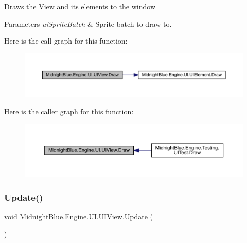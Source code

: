 Draws the View and its elements to the window 


\begin{DoxyParams}{Parameters}
{\em ui\+Sprite\+Batch} & Sprite batch to draw to.\\
\hline
\end{DoxyParams}
Here is the call graph for this function\+:
\nopagebreak
\begin{figure}[H]
\begin{center}
\leavevmode
\includegraphics[width=350pt]{class_midnight_blue_1_1_engine_1_1_u_i_1_1_u_i_view_a167c98165d6ed4031b371c6a92b95a1e_cgraph}
\end{center}
\end{figure}
Here is the caller graph for this function\+:
\nopagebreak
\begin{figure}[H]
\begin{center}
\leavevmode
\includegraphics[width=350pt]{class_midnight_blue_1_1_engine_1_1_u_i_1_1_u_i_view_a167c98165d6ed4031b371c6a92b95a1e_icgraph}
\end{center}
\end{figure}
\hypertarget{class_midnight_blue_1_1_engine_1_1_u_i_1_1_u_i_view_aba1d6f02ef75ed1a595f448acef47915}{}\label{class_midnight_blue_1_1_engine_1_1_u_i_1_1_u_i_view_aba1d6f02ef75ed1a595f448acef47915} 
\subsubsection{\texorpdfstring{Update()}{Update()}}
{\footnotesize\ttfamily void Midnight\+Blue.\+Engine.\+U\+I.\+U\+I\+View.\+Update (\begin{DoxyParamCaption}{ }\end{DoxyParamCaption})\hspace{0.3cm}{\ttfamily [inline]}}



